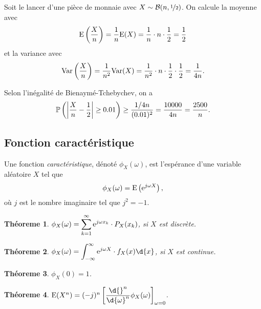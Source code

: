 \documentclass[11pt]{article}
\renewcommand\P{%
	\ensuremath{%
		\mathbb{P}%
	}%
}%
\newcommand\e{%
	\ensuremath{%
		\mathrm{e}%
	}%
}%
\newcommand\bin{%
	\ensuremath{%
		\mathcal{B}%
	}%
}%
\newcommand\Esp{%
	\ensuremath{%
		\mathrm{E}%
	}%
}%
\newcommand\Var{%
	\ensuremath{%
		\mathrm{Var}%
	}%
}%
\newtheorem{theoreme}{Théoreme}[section]
\begin{document}
\begin{exemple}
	Soit le lancer d'une pièce de monnaie avec $X\sim\bin(n,\nicefrac{1}{2})$.
	On calcule la moyenne avec
	\begin{equation*}
		\Esp\left(\frac{X}{n}\right)
		=\frac{1}{n}\Esp(X)
		=\frac{1}{n}\cdot n\cdot\frac{1}{2}
		=\frac{1}{2}
	\end{equation*}
	et la variance avec
	\begin{equation*}
		\Var\left(\frac{X}{n}\right)
		=\frac{1}{n^2}\Var(X)
		=\frac{1}{n^2}\cdot n\cdot\frac{1}{2}\cdot\frac{1}{2}
		=\frac{1}{4n}.
	\end{equation*}

	Selon l'inégalité de Bienaymé-Tchebychev, on a
	\begin{equation*}
		\P\left(\left|\frac{X}{n}-\frac{1}{2}\right|\geq 0.01\right)
		\geq\frac{1/4n}{(0.01)^2}
		=\frac{10000}{4n}
		=\frac{2500}{n}.
	\end{equation*}
\end{exemple}

\subsection{Fonction caractéristique}
\begin{definition}
	Une fonction \textit{caractéristique}, dénoté $\phi_X(\omega)$, est
	l'espérance d'une variable aléatoire $X$ tel que
	\begin{equation*}
		\phi_X(\omega)=\Esp\left(\e^{j\omega X}\right),
	\end{equation*}
	où $j$ est le nombre imaginaire tel que $j^2=-1$.
\end{definition}

\begin{theoreme}
	$\phi_X(\omega)=\displaystyle\sum_{k=1}^\infty\e^{j\omega x_k}\cdot
	P_X(x_k)$, si $X$ est discrète.
\end{theoreme}

\begin{theoreme}
	$\phi_X(\omega)=\displaystyle\int_{-\infty}^\infty\e^{j\omega X}\cdot
	f_X(x)\d{x}$, si $X$ est continue.
\end{theoreme}

\begin{theoreme}
	$\phi_X(0)=1$.
\end{theoreme}

\begin{theoreme}
	$\Esp(X^n)=(-j)^n\left[
	\dfrac{\d{}^n}{\d{\omega}^n}\phi_X(\omega)\right]_{\omega=0}$.
\end{theoreme}
\end{document}
